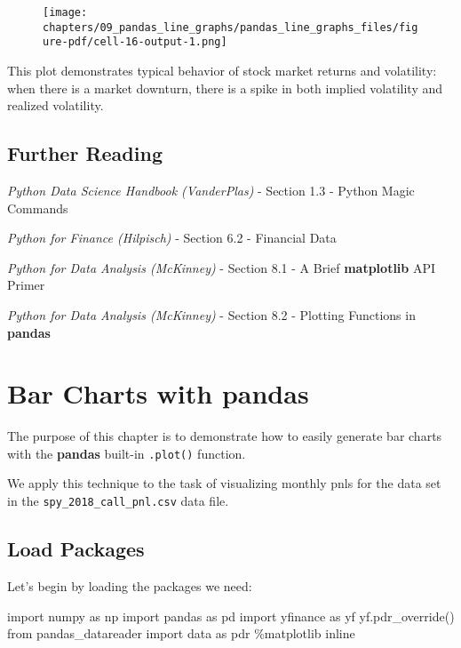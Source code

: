 \documentclass[
  letterpaper,
  DIV=11,
  numbers=noendperiod]{scrreprt}
\newenvironment{Shaded}{\begin{snugshade}}{\end{snugshade}}
\newcommand{\ImportTok}[1]{\textcolor[rgb]{0.00,0.46,0.62}{#1}}
\newcommand{\NormalTok}[1]{\textcolor[rgb]{0.00,0.23,0.31}{#1}}
\newcommand{\OperatorTok}[1]{\textcolor[rgb]{0.37,0.37,0.37}{#1}}
\begin{document}
\begin{figure}[H]

{\centering \texttt{[image: chapters/09\_pandas\_line\_graphs/pandas\_line\_graphs\_files/figure-pdf/cell-16-output-1.png]}

}

\end{figure}

This plot demonstrates typical behavior of stock market returns and
volatility: when there is a market downturn, there is a spike in both
implied volatility and realized volatility.

\hypertarget{further-reading-1}{%
\section{Further Reading}\label{further-reading-1}}

\emph{Python Data Science Handbook (VanderPlas)} - Section 1.3 - Python
Magic Commands

\emph{Python for Finance (Hilpisch)} - Section 6.2 - Financial Data

\emph{Python for Data Analysis (McKinney)} - Section 8.1 - A Brief
\textbf{matplotlib} API Primer

\emph{Python for Data Analysis (McKinney)} - Section 8.2 - Plotting
Functions in \textbf{pandas}

\hypertarget{bar-charts-with-pandas}{%
\chapter{\texorpdfstring{Bar Charts with
\textbf{pandas}}{Bar Charts with pandas}}\label{bar-charts-with-pandas}}

The purpose of this chapter is to demonstrate how to easily generate bar
charts with the \textbf{pandas} built-in \texttt{.plot()} function.

We apply this technique to the task of visualizing monthly pnls for the
data set in the \texttt{spy\_2018\_call\_pnl.csv} data file.

\hypertarget{load-packages-1}{%
\section{Load Packages}\label{load-packages-1}}

Let's begin by loading the packages we need:

\begin{Shaded}
\begin{Highlighting}[]
\ImportTok{import}\NormalTok{ numpy }\ImportTok{as}\NormalTok{ np}
\ImportTok{import}\NormalTok{ pandas }\ImportTok{as}\NormalTok{ pd}
\ImportTok{import}\NormalTok{ yfinance }\ImportTok{as}\NormalTok{ yf}
\NormalTok{yf.pdr\_override()}
\ImportTok{from}\NormalTok{ pandas\_datareader }\ImportTok{import}\NormalTok{ data }\ImportTok{as}\NormalTok{ pdr}
\OperatorTok{\%}\NormalTok{matplotlib inline}
\end{Highlighting}
\end{Shaded}
\end{document}

